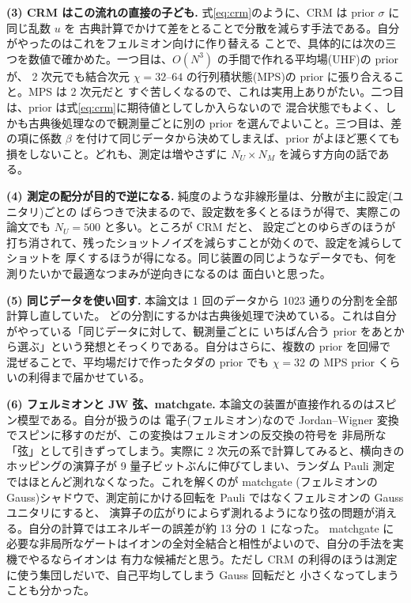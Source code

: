 \documentclass[10pt,a4paper,twocolumn]{ltjsarticle}
\begin{document}
\textbf{(3) CRM はこの流れの直接の子ども.} 式\eqref{eq:crm}のように、CRM は prior $\sigma$ に同じ乱数 $u$ を
古典計算でかけて差をとることで分散を減らす手法である。自分がやったのはこれをフェルミオン向けに作り替える
ことで、具体的には次の三つを数値で確かめた。一つ目は、$O(N^3)$ の手間で作れる平均場(UHF)の prior が、
2 次元でも結合次元 $\chi{=}32$--$64$ の行列積状態(MPS)の prior に張り合えること。MPS は 2 次元だと
すぐ苦しくなるので、これは実用上ありがたい。二つ目は、prior は式\eqref{eq:crm}に期待値としてしか入らないので
混合状態でもよく、しかも古典後処理なので観測量ごとに別の prior を選んでよいこと。三つ目は、差の項に係数
$\beta$ を付けて同じデータから決めてしまえば、prior がよほど悪くても損をしないこと。どれも、測定は増やさずに
$N_U\times N_M$ を減らす方向の話である。

\textbf{(4) 測定の配分が目的で逆になる.} 純度のような非線形量は、分散が主に設定(ユニタリ)ごとの
ばらつきで決まるので、設定数を多くとるほうが得で、実際この論文でも $N_U{=}500$ と多い。ところが CRM だと、
設定ごとのゆらぎのほうが打ち消されて、残ったショットノイズを減らすことが効くので、設定を減らしてショットを
厚くするほうが得になる。同じ装置の同じようなデータでも、何を測りたいかで最適なつまみが逆向きになるのは
面白いと思った。

\textbf{(5) 同じデータを使い回す.} 本論文は 1 回のデータから 1023 通りの分割を全部計算し直していた。
どの分割にするかは古典後処理で決めている。これは自分がやっている「同じデータに対して、観測量ごとに
いちばん合う prior をあとから選ぶ」という発想とそっくりである。自分はさらに、複数の prior を回帰で
混ぜることで、平均場だけで作ったタダの prior でも $\chi{=}32$ の MPS prior くらいの利得まで届かせている。

\textbf{(6) フェルミオンと JW 弦、matchgate.} 本論文の装置が直接作れるのはスピン模型である。自分が扱うのは
電子(フェルミオン)なので Jordan--Wigner 変換でスピンに移すのだが、この変換はフェルミオンの反交換の符号を
非局所な「弦」として引きずってしまう。実際に 2 次元の系で計算してみると、横向きのホッピングの演算子が
9 量子ビットぶんに伸びてしまい、ランダム Pauli 測定ではほとんど測れなくなった。これを解くのが matchgate
(フェルミオンの Gauss)シャドウで、測定前にかける回転を Pauli ではなくフェルミオンの Gauss ユニタリにすると、
演算子の広がりによらず測れるようになり弦の問題が消える。自分の計算ではエネルギーの誤差が約 13 分の 1 になった。
matchgate に必要な非局所なゲートはイオンの全対全結合と相性がよいので、自分の手法を実機でやるならイオンは
有力な候補だと思う。ただし CRM の利得のほうは測定に使う集団しだいで、自己平均してしまう Gauss 回転だと
小さくなってしまうことも分かった。
\end{document}
